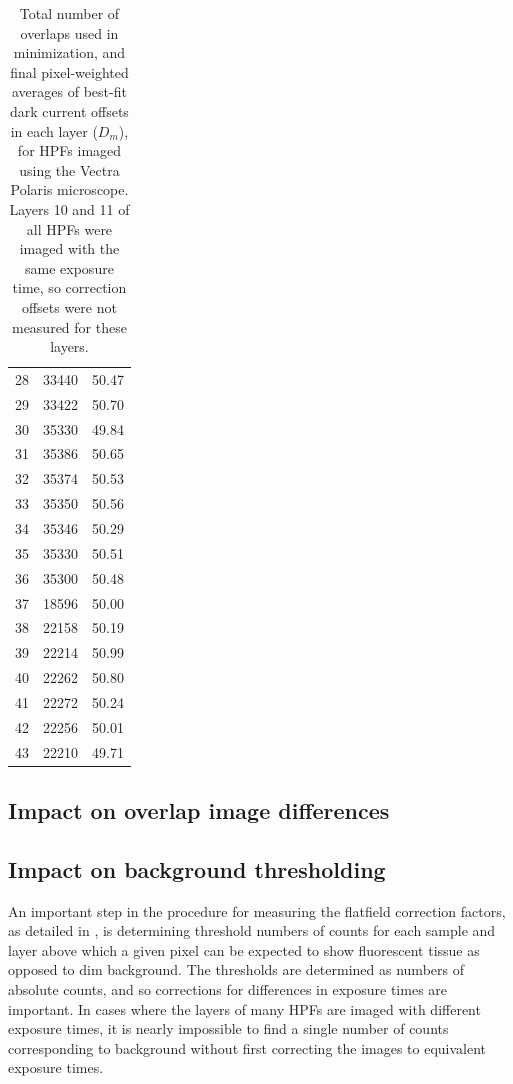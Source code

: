 \documentclass[letterpaper,11pt]{article}
\begin{document}
\begin{table}[!htb]
\begin{tabular}{c c c}
28              & 33440              & 50.47 \\
29              & 33422              & 50.70 \\
30              & 35330              & 49.84 \\
31              & 35386              & 50.65 \\
32              & 35374              & 50.53 \\
33              & 35350              & 50.56 \\
34              & 35346              & 50.29 \\
35              & 35330              & 50.51 \\
36              & 35300              & 50.48 \\
37              & 18596              & 50.00 \\
38              & 22158              & 50.19 \\
39              & 22214              & 50.99 \\
40              & 22262              & 50.80 \\
41              & 22272              & 50.24 \\
42              & 22256              & 50.01 \\
43              & 22210              & 49.71 \\
\hline
\end{tabular}
\caption{\footnotesize Total number of overlaps used in minimization, and final pixel-weighted averages of best-fit dark current offsets in each layer ($D_{m}$), for HPFs imaged using the Vectra Polaris microscope. Layers 10 and 11 of all HPFs were imaged with the same exposure time, so correction offsets were not measured for these layers.}
\label{tab:best_offsets_polaris}
\end{table}

\subsection{Impact on overlap image differences}
\label{ssec:impact_on_overlap_image_differences}

\subsection{Impact on background thresholding}
\label{ssec:impact_on_background_threshold}

An important step in the procedure for measuring the flatfield correction factors, as detailed in \cite{flatfielding_note}, is determining threshold numbers of counts for each sample and layer above which a given pixel can be expected to show fluorescent tissue as opposed to dim background. The thresholds are determined as numbers of absolute counts, and so corrections for differences in exposure times are important. In cases where the layers of many HPFs are imaged with different exposure times, it is nearly impossible to find a single number of counts corresponding to background without first correcting the images to equivalent exposure times.
\end{document}
